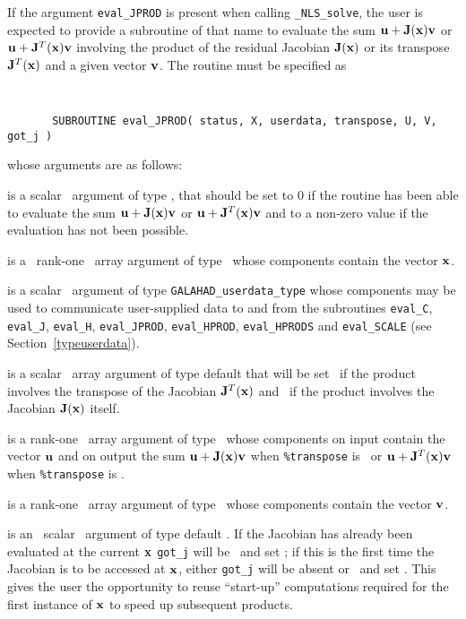 \documentclass{galahad}
\newcommand{\packagename}{NLS}
\newcommand{\fullpackagename}{\libraryname\_\packagename}
\newcommand{\solver}{{\tt \fullpackagename\_solve}}
\begin{document}
If the argument {\tt eval\_JPROD} is present when calling \solver, the
user is expected to provide a subroutine of that name to evaluate the
sum ${\mathbf{u}} + {\mathbf{J}}({\mathbf{x}}) {\mathbf{v}}$ or ${\mathbf{u}} + {\mathbf{J}}^T({\mathbf{x}}){\mathbf{v}}$ involving the
product of the residual Jacobian ${\mathbf{J}}({\mathbf{x}})$ or its transpose ${\mathbf{J}}^T({\mathbf{x}})$
and a given vector ${\mathbf{v}}$.
The routine must be specified as

\def\baselinestretch{0.8}
{\tt
\begin{verbatim}
       SUBROUTINE eval_JPROD( status, X, userdata, transpose, U, V, got_j )
\end{verbatim} }
\def\baselinestretch{1.0}
\noindent whose arguments are as follows:

\begin{description}
 is a scalar \intentout\ argument of type \integer,
that should be set to 0 if the routine has been able to evaluate the
sum ${\mathbf{u}} + {\mathbf{J}}({\mathbf{x}}) {\mathbf{v}}$ or ${\mathbf{u}} + {\mathbf{J}}^T({\mathbf{x}}){\mathbf{v}}$
and to a non-zero value if the evaluation has not been possible.

 is a \ rank-one \intentin\ array argument of type
\realdp\ whose components contain the vector ${\mathbf{x}}$.

 is a scalar \intentinout\ argument of type
{\tt GALAHAD\_userdata\_type} whose components may be used
to communicate user-supplied data to and from the subroutines
{\tt eval\_C}, {\tt eval\_J}, {\tt eval\_H}, {\tt eval\_JPROD},
{\tt eval\_HPROD}, {\tt eval\_HPRODS} and {\tt eval\_SCALE}
(see Section~\ref{typeuserdata}).

 is a scalar \intentin\ array argument of type
default that will be set \true\ if the product involves the transpose
of the Jacobian ${\mathbf{J}}^T({\mathbf{x}})$ and \false\ if the product involves
the Jacobian ${\mathbf{J}}({\mathbf{x}})$ itself.

 is a rank-one \intentinout\ array argument of type \realdp\
whose components on input contain the vector ${\mathbf{u}}$ and on output the
sum ${\mathbf{u}} + {\mathbf{J}}({\mathbf{x}}) {\mathbf{v}}$ when {\tt \%transpose} is \false\ or
${\mathbf{u}} + {\mathbf{J}}^T({\mathbf{x}}) {\mathbf{v}}$ when {\tt \%transpose} is \true.

 is a rank-one \intentin\ array argument of type \realdp\
whose components contain the vector ${\mathbf{v}}$.

 is an \optional\ scalar \intentin\ argument of type default
\logical. If the Jacobian has already been evaluated at the current ${\mathbf{x}}$
{\tt got\_j} will be \present\ and set \true; if this is the first time
the Jacobian is to be accessed at ${\mathbf{x}}$, either {\tt got\_j} will be absent
or \present\ and set \false. This gives the user the opportunity
to reuse ``start-up'' computations required for the first instance of
${\mathbf{x}}$ to speed up subsequent products.

\end{description}
\end{document}
